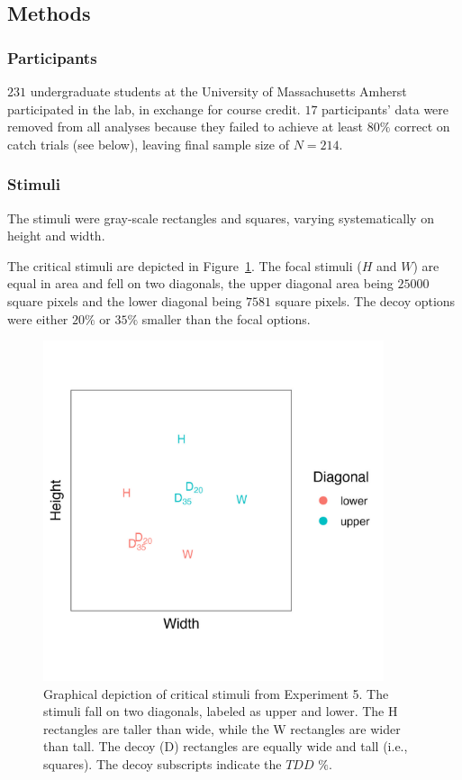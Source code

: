 \subsection{Methods}

\subsubsection{Participants}
$231$ undergraduate students at the University of Massachusetts Amherst participated in the lab, in exchange for course credit. $17$ participants' data were removed from all analyses because they failed to achieve at least $80\%$ correct on catch trials (see below), leaving final sample size of $N=214$. 

\subsubsection{Stimuli}
The stimuli were gray-scale rectangles and squares, varying systematically on height and width. 

The critical stimuli are depicted in Figure~\ref{fig:comparability_stim_plot}. The focal stimuli ($H$ and $W$) are equal in area and fell on two diagonals, the upper diagonal area being $25000$ square pixels and the lower diagonal being $7581$ square pixels. The decoy options were either $20\%$ or $35\%$ smaller than the focal options.

\begin{figure}
   \includegraphics[width=100mm]{figures/comparability_stim.jpg}
   \caption{Graphical depiction of critical stimuli from Experiment 5. The stimuli fall on two diagonals, labeled as upper and lower. The H rectangles are taller than wide, while the W rectangles are wider than tall. The decoy (D) rectangles are equally wide and tall (i.e., squares). The decoy subscripts indicate the $TDD$ $\%$.}
   \label{fig:comparability_stim_plot}
\end{figure}

